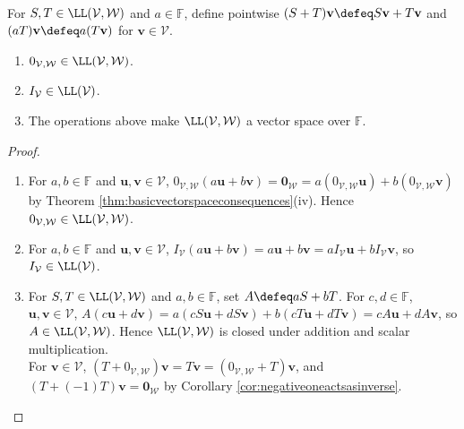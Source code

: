 \begin{definition} \\
For $S,T\in\LL(\mathcal{V},\mathcal{W})$ and $a\in\mathbb{F}$, define pointwise $(S+T)\mathbf{v}\defeq S\mathbf{v}+T\mathbf{v}$ and $(aT)\mathbf{v}\defeq a(T\mathbf{v})$ for $\mathbf{v}\in\mathcal{V}$.
\end{definition}

\begin{proposition} \label{prop:linear-maps-form-vector-space} 
\begin{enumerate}[label=(\roman*)]
\setlength{\itemsep}{0pt}
\item $0_{\mathcal{V},\mathcal{W}}\in\LL(\mathcal{V},\mathcal{W})$.
\item $I_{\mathcal{V}}\in\LL(\mathcal{V})$.
\item The operations above make $\LL(\mathcal{V},\mathcal{W})$ a vector space over $\mathbb{F}$.
\end{enumerate}
\begin{proof}
\begin{enumerate}[label=(\roman*)]
\setlength{\itemsep}{0pt}
\item For $a,b\in\mathbb{F}$ and $\mathbf{u},\mathbf{v}\in\mathcal{V}$, $0_{\mathcal{V},\mathcal{W}}(a\mathbf{u}+b\mathbf{v})=\mathbf{0}_{\mathcal{W}}=a(0_{\mathcal{V},\mathcal{W}}\mathbf{u})+b(0_{\mathcal{V},\mathcal{W}}\mathbf{v})$ by Theorem \ref{thm:basicvectorspaceconsequences}(iv). Hence $0_{\mathcal{V},\mathcal{W}}\in\LL(\mathcal{V},\mathcal{W})$.
\item For $a,b\in\mathbb{F}$ and $\mathbf{u},\mathbf{v}\in\mathcal{V}$, $I_{\mathcal{V}}(a\mathbf{u}+b\mathbf{v})=a\mathbf{u}+b\mathbf{v}=aI_{\mathcal{V}}\mathbf{u}+bI_{\mathcal{V}}\mathbf{v}$, so $I_{\mathcal{V}}\in\LL(\mathcal{V})$.
\item For $S,T\in\LL(\mathcal{V},\mathcal{W})$ and $a,b\in\mathbb{F}$, set $A\defeq aS+bT$. For $c,d\in\mathbb{F}$, $\mathbf{u},\mathbf{v}\in\mathcal{V}$, $A(c\mathbf{u}+d\mathbf{v})=a(cS\mathbf{u}+dS\mathbf{v})+b(cT\mathbf{u}+dT\mathbf{v})=cA\mathbf{u}+dA\mathbf{v}$, so $A\in\LL(\mathcal{V},\mathcal{W})$. Hence $\LL(\mathcal{V},\mathcal{W})$ is closed under addition and scalar multiplication.\\
For $\mathbf{v}\in\mathcal{V}$, $(T+0_{\mathcal{V},\mathcal{W}})\mathbf{v}=T\mathbf{v}=(0_{\mathcal{V},\mathcal{W}}+T)\mathbf{v}$, and $(T+(-1)T)\mathbf{v}=\mathbf{0}_{\mathcal{W}}$ by Corollary \ref{cor:negativeoneactsasinverse}.\\

\end{enumerate}
\end{proof}
\end{proposition}
